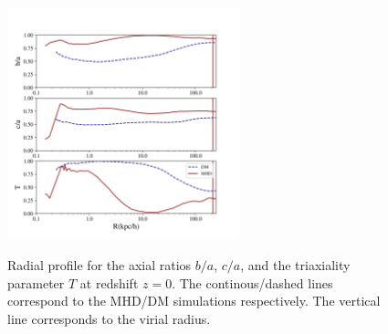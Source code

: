 \documentclass[a4paper,fleqn,usenatbib]{mnras}
\begin{document}
\begin{figure}
\centering
{\includegraphics[width=0.6\textwidth]{./pics/MHD_Vs_DM/halo16_new.png}}
\caption{Radial profile for the axial ratios $b/a$, $c/a$, and the triaxiality parameter
  $T$ at redshift $z=0$.
  The continous/dashed lines correspond to the MHD/DM simulations respectively.
  The vertical line corresponds to the virial radius.}
\label{fig:triaxial_radius}
\end{figure} 
\end{document}
